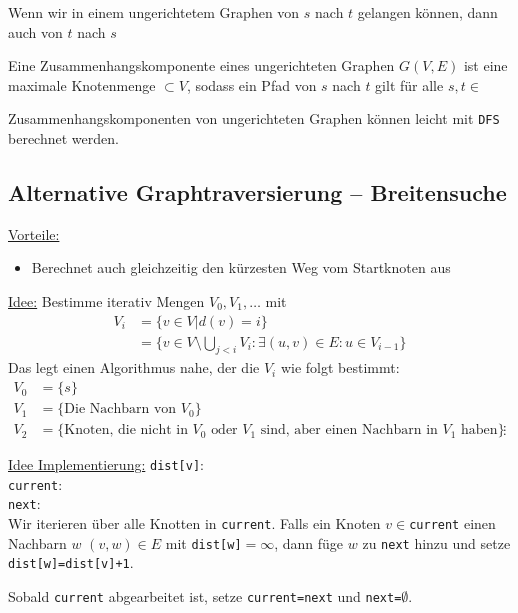 \documentclass[11pt]{scrartcl}
\begin{document}
\begin{note}
Wenn wir in einem ungerichtetem Graphen von $s$ nach $t$ gelangen können, dann auch von $t$ nach $s$
\end{note}

\begin{df}
Eine Zusammenhangskomponente  eines ungerichteten Graphen $G(V,E)$ ist eine maximale Knotenmenge $\subset V$, sodass
ein Pfad von $s$ nach $t$ gilt für alle $s,t\in$
\begin{note}
Zusammenhangskomponenten von ungerichteten Graphen können leicht mit \verb|DFS| berechnet werden.
\end{note}
\end{df}

\subsection{Alternative Graphtraversierung – Breitensuche}

\underline{Vorteile:}
\begin{itemize}
\item Berechnet auch gleichzeitig den kürzesten Weg vom Startknoten aus
\end{itemize}
\underline{Idee:}
Bestimme iterativ Mengen $V_0,V_1,\dotsc$ mit
\begin{align*}
V_i&=\{v\in V|d(v)=i\}\\
&=\{v\in V\setminus \bigcup_{j<i}V_i : \exists (u,v)\in E : u\in V_{i-1}\}
\end{align*}
Das legt einen Algorithmus nahe, der die $V_i$ wie folgt bestimmt:
\begin{align*}
V_0&=\{s\}\\
V_1 &= \{\text{Die Nachbarn von $V_0$}\}\\
V_2 &= \{\text{Knoten, die nicht in $V_0$ oder $V_1$ sind, aber einen Nachbarn in $V_1$ haben}\}
&\vdots 
\end{align*}

\underline{Idee Implementierung:}
\verb|dist[v]|:\\
\verb|current|:\\
\verb|next|:\\

Wir iterieren über alle Knotten in \verb|current|.
Falls ein Knoten $v\in$\verb|current| einen Nachbarn $w$ $(v,w) \in E$ mit 
\verb|dist[w]|$=\infty$, dann füge $w$ zu \verb|next| hinzu und setze \verb|dist[w]=dist[v]+1|.

Sobald \verb|current| abgearbeitet ist, setze \verb|current=next| und \verb|next=|$\emptyset$.
\end{document}
